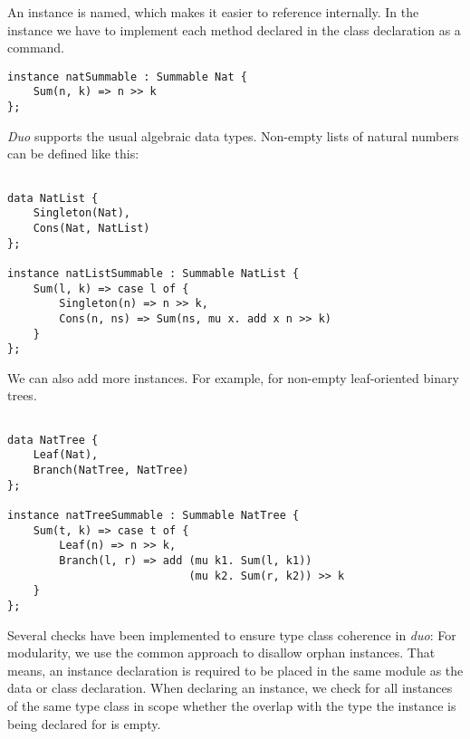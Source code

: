 An instance is named, which makes it easier to reference internally.
In the instance we have to implement each method declared in the class declaration as a command.

\begin{lstlisting}[style=duostyle, label=code:duo-nat-list, captionpos=b, caption={Instance declaration for natural numbers in \emph{duo}}]
instance natSummable : Summable Nat {
    Sum(n, k) => n >> k
};
\end{lstlisting}

\emph{Duo} supports the usual algebraic data types. Non-empty lists of natural numbers can be defined like this:

\begin{lstlisting}[style=duostyle, label=code:duo-nat-list-two, captionpos=b, caption={Data and instance declaration for non-empty lists of in \emph{duo}}]

data NatList {
    Singleton(Nat),
    Cons(Nat, NatList)
};

instance natListSummable : Summable NatList {
    Sum(l, k) => case l of {
        Singleton(n) => n >> k,
        Cons(n, ns) => Sum(ns, mu x. add x n >> k)
    }
};

\end{lstlisting}

We can also add more instances. For example, for non-empty leaf-oriented binary trees.

\begin{lstlisting}[style=duostyle, label=code:duo-tree-instance, captionpos=b, caption={Type class example  in \emph{duo}}]

data NatTree {
    Leaf(Nat),
    Branch(NatTree, NatTree)
};

instance natTreeSummable : Summable NatTree {
    Sum(t, k) => case t of {
        Leaf(n) => n >> k,
        Branch(l, r) => add (mu k1. Sum(l, k1))
                            (mu k2. Sum(r, k2)) >> k
    }
};

\end{lstlisting}

Several checks have been implemented to ensure type class coherence in \emph{duo}:
For modularity, we use the common approach to disallow orphan instances. \cite{Kilpatrick2019-cy}
That means, an instance declaration is required to be placed in the same module as the data or class declaration.
When declaring an instance, we check for all instances of the same type class in scope whether the overlap with the type the instance is being declared for is empty.


